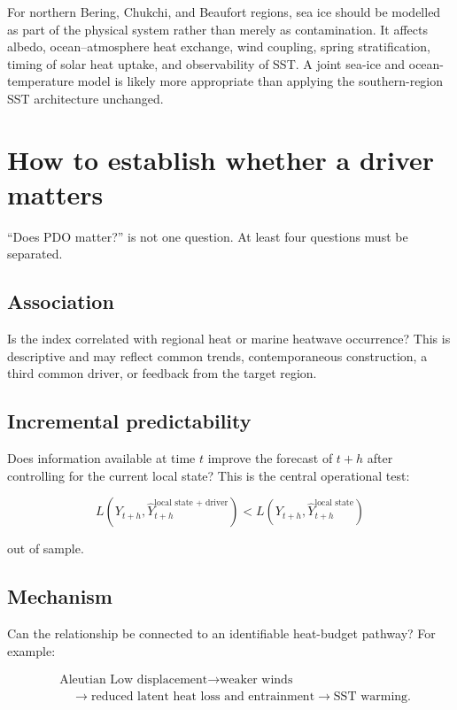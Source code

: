 \documentclass[11pt]{article}
\newcommand{\MHW}{marine heatwave}
\begin{document}
For northern Bering, Chukchi, and Beaufort regions, sea ice should be modelled as part of the physical system rather than merely as contamination. It affects albedo, ocean--atmosphere heat exchange, wind coupling, spring stratification, timing of solar heat uptake, and observability of SST. A joint sea-ice and ocean-temperature model is likely more appropriate than applying the southern-region SST architecture unchanged.

\section{How to establish whether a driver matters}

``Does PDO matter?'' is not one question. At least four questions must be separated.

\subsection{Association}

Is the index correlated with regional heat or \MHW{} occurrence? This is descriptive and may reflect common trends, contemporaneous construction, a third common driver, or feedback from the target region.

\subsection{Incremental predictability}

Does information available at time $t$ improve the forecast of $t+h$ after controlling for the current local state? This is the central operational test:

\begin{equation}
L\!\left(Y_{t+h},\hat Y^{\text{local state + driver}}_{t+h}\right)
<
L\!\left(Y_{t+h},\hat Y^{\text{local state}}_{t+h}\right)
\end{equation}

out of sample.

\subsection{Mechanism}

Can the relationship be connected to an identifiable heat-budget pathway? For example:

\begin{align*}
&\text{Aleutian Low displacement}
\rightarrow \text{weaker winds}\\
&\quad \rightarrow \text{reduced latent heat loss and entrainment}
\rightarrow \text{SST warming}.
\end{align*}
\end{document}
